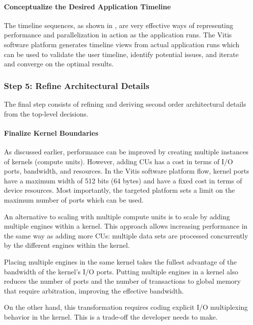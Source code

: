 \paragraph{Conceptualize the Desired Application Timeline}
The timeline sequences, as shown in , are very effective ways of representing performance and parallelization in action as the application runs. The Vitis software platform generates timeline views from actual application runs which can be used to validate the user timeline, identify potential issues, and iterate and converge on the optimal results.

\subsubsection{Step 5: Refine Architectural Details}
The final step consists of refining and deriving second order architectural details from the top-level decisions.

\paragraph{Finalize Kernel Boundaries}
As discussed earlier, performance can be improved by creating multiple instances of kernels (compute units). However, adding CUs has a cost in terms of I/O ports, bandwidth, and resources. In the Vitis software platform flow, kernel ports have a maximum width of 512 bits (64 bytes) and have a fixed cost in terms of device resources. Most importantly, the targeted platform sets a limit on the maximum number of ports which can be used.

\par An alternative to scaling with multiple compute units is to scale by adding multiple engines within a kernel. This approach allows increasing performance in the same way as adding more CUs: multiple data sets are processed concurrently by the different engines within the kernel.

\par Placing multiple engines in the same kernel takes the fullest advantage of the bandwidth of the kernel's I/O ports. Putting multiple engines in a kernel also reduces the number of ports and the number of transactions to global memory that require arbitration, improving the effective bandwidth.

\par On the other hand, this transformation requires coding explicit I/O multiplexing behavior in the kernel. This is a trade-off the developer needs to make. 

